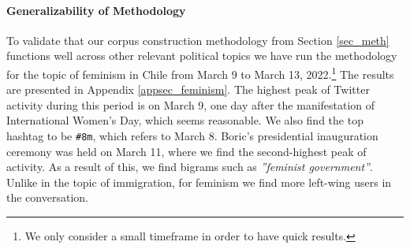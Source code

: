     
    
    \paragraph{Generalizability of Methodology} 
    
    To validate that our corpus construction methodology from Section \ref{sec_meth} functions well across other relevant political topics we have run the methodology for the topic of feminism in Chile from March 9 to March 13, 2022.\footnote{We only consider a small timeframe in order to have quick results.} The results are presented in Appendix \ref{appsec_feminism}. The highest peak of Twitter activity during this period is on March 9, one day after the manifestation of International Women's Day, which seems reasonable. We also find the top hashtag to be \texttt{\#8m}, which refers to March 8. Boric's presidential inauguration ceremony was held on March 11, where we find the second-highest peak of activity. As a result of this, we find bigrams such as {\it ''feminist government''}. Unlike in the topic of immigration, for feminism we find more left-wing users in the conversation. 
    